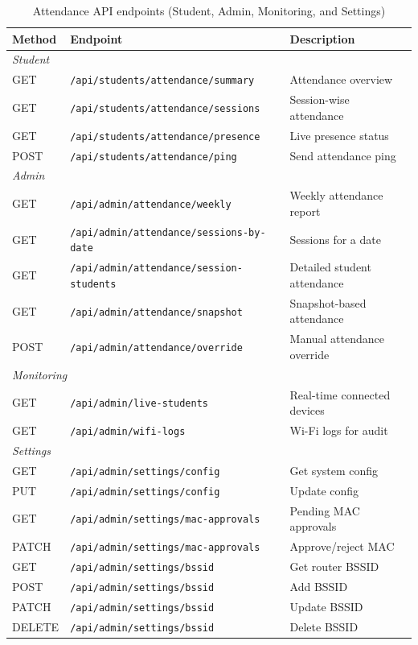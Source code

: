\begin{table}[!ht]
    \centering
    \begin{tabular}{|l|l|p{5.5cm}|}
    \hline
    \textbf{Method} & \textbf{Endpoint} & \textbf{Description} \\ \hline
    \multicolumn{3}{|l|}{\textit{Student}} \\ \hline
    GET  & \texttt{/api/students/attendance/summary}  & Attendance overview \\
    GET  & \texttt{/api/students/attendance/sessions} & Session-wise attendance \\
    GET  & \texttt{/api/students/attendance/presence} & Live presence status \\
    POST & \texttt{/api/students/attendance/ping}     & Send attendance ping \\ \hline
    \multicolumn{3}{|l|}{\textit{Admin}} \\ \hline
    GET  & \texttt{/api/admin/attendance/weekly}            & Weekly attendance report \\
    GET  & \texttt{/api/admin/attendance/sessions-by-date}  & Sessions for a date \\
    GET  & \texttt{/api/admin/attendance/session-students}  & Detailed student attendance \\
    GET  & \texttt{/api/admin/attendance/snapshot}          & Snapshot-based attendance \\
    POST & \texttt{/api/admin/attendance/override}          & Manual attendance override \\ \hline
    \multicolumn{3}{|l|}{\textit{Monitoring}} \\ \hline
    GET & \texttt{/api/admin/live-students} & Real-time connected devices \\
    GET & \texttt{/api/admin/wifi-logs}     & Wi-Fi logs for audit \\ \hline
    \multicolumn{3}{|l|}{\textit{Settings}} \\ \hline
    GET    & \texttt{/api/admin/settings/config}         & Get system config \\
    PUT    & \texttt{/api/admin/settings/config}         & Update config \\
    GET    & \texttt{/api/admin/settings/mac-approvals}  & Pending MAC approvals \\
    PATCH  & \texttt{/api/admin/settings/mac-approvals}  & Approve/reject MAC \\
    GET    & \texttt{/api/admin/settings/bssid}          & Get router BSSID \\
    POST   & \texttt{/api/admin/settings/bssid}          & Add BSSID \\
    PATCH  & \texttt{/api/admin/settings/bssid}          & Update BSSID \\
    DELETE & \texttt{/api/admin/settings/bssid}          & Delete BSSID \\ \hline
    \end{tabular}
    \caption{Attendance API endpoints (Student, Admin, Monitoring, and Settings)}
    \label{tab:api_attendance}
\end{table}

